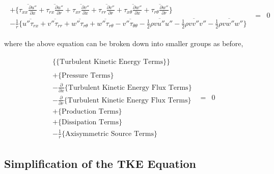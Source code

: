 \begin{equation}
\begin{array}{ccc}
\begin{array}{c}
	+ \Big\{\overline{\tau_{xx}\frac{\partial u''}{\partial x}} + \overline{\tau_{rx}\frac{\partial u''}{\partial r}} 
	+ \overline{\tau_{xr}\frac{\partial v''}{\partial x}} + \overline{\tau_{rr}\frac{\partial v''}{\partial r}}
	+ \overline{\tau_{x\theta}\frac{\partial w''}{\partial x}} 
	+ \overline{\tau_{r\theta}\frac{\partial w''}{\partial r}}\Big\} \\
	
	-\frac{1}{r}\Big\{\overline{u''\tau_{rx}} + \overline{v''\tau_{rr}} + \overline{w''\tau_{r\theta}}
	+ \overline{w''\tau_{r\theta}} -\overline{v''\tau_{\theta \theta}}
	- \overline{\frac{1}{2} \rho v u'' u''} - \overline{\frac{1}{2} \rho v v''v''} 
	- \overline{\frac{1}{2} \rho v w'' w''} \Big\}
   \end{array}
  & = & 0
  \end{array}		
\label{eqn:turbxrthetamom}
\end{equation}

	where the above equation can be broken down into smaller groups as before,

\begin{equation}
   \begin{array}{ccc}
      \begin{array}{c}
	\Bigg \{ \Big \{ \textrm{Turbulent Kinetic Energy Terms}\Big \} \Bigg \} \\ \\
	+ \Big \{ \textrm{Pressure Terms}\Big \} \\
	- \frac{\partial}{\partial x}\Big\{\textrm{Turbulent Kinetic Energy Flux Terms}\Big\} \\
	- \frac{\partial}{\partial r}\Big\{\textrm{Turbulent Kinetic Energy Flux Terms}\Big\} \\
	+ \Big\{\textrm{Production Terms}\Big\} \\
	+ \Big\{\textrm{Dissipation Terms}\Big\} \\
	- \frac{1}{r}\Big\{\textrm{Axisymmetric Source Terms}\Big\}
      \end{array}
	& = & 0
   \end{array}
\label{eqn:turbgroups}
\end{equation}

\subsection{Simplification of the TKE Equation}

